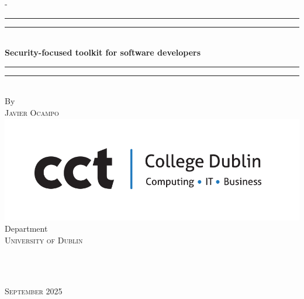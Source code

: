 %
%
\begin{titlingpage}
\begin{SingleSpace}
\calccentering{\unitlength} 
\begin{adjustwidth*}{\unitlength}{-\unitlength}
\vspace*{13mm}
\begin{center}
\rule[0.5ex]{\linewidth}{2pt}\vspace*{-\baselineskip}\vspace*{3.2pt}
\rule[0.5ex]{\linewidth}{1pt}\\[\baselineskip]

\linespread{2.0} \selectfont
%
{\Large \textbf{Security-focused toolkit for software developers}
}

%
\rule[0.5ex]{\linewidth}{1pt}\vspace*{-\baselineskip}\vspace{3.2pt}
\rule[0.5ex]{\linewidth}{2pt}\\
\vspace{6.5mm}
{\large By}\\
\vspace{6.5mm}
{\large\textsc{Javier Ocampo}}\\
\vspace{11mm}
\includegraphics[scale=0.3]{logos/CCT_Logo.jpg}\\
\vspace{6mm}
{\large Department\\
\textsc{University of Dublin}}\\
\vspace{11mm}
\begin{minipage}{10cm}
 \\
\end{minipage}\\
\vspace{9mm}
{\large\textsc{September 2025}}
\vspace{12mm}
\end{center}
\begin{flushright}

\end{flushright}
\end{adjustwidth*}
\end{SingleSpace}
\end{titlingpage}